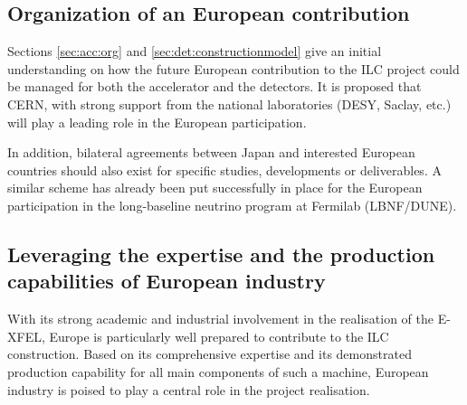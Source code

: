 \documentclass[%
 reprint,
 floatfix,
 amsmath,amssymb,
 aps,
]{revtex4-1}
\begin{document}


\subsection{\label{sec:discussionOrg} Organization of an European contribution}
Sections \ref{sec:acc:org} and \ref{sec:det:constructionmodel} give an initial understanding on how the future European contribution
to the ILC project could be managed for both the accelerator and the detectors. It is proposed that CERN, with strong support from the national laboratories (DESY, Saclay, etc.) will play a leading role in the European participation. 

In addition, bilateral agreements between Japan and interested European countries should also exist for specific studies, developments or deliverables. A similar scheme has already been put successfully in place for the European participation in the long-baseline neutrino program at Fermilab (LBNF/DUNE).

\subsection{\label{sec:discussionInd}Leveraging the expertise and the production capabilities of European industry}
With its strong academic and industrial involvement in the realisation of the E-XFEL, Europe is particularly well prepared to contribute to the ILC construction. Based on its comprehensive expertise and its demonstrated production capability for all main components of such a machine, European industry is poised to play a central role in the project realisation. 
\end{document}
